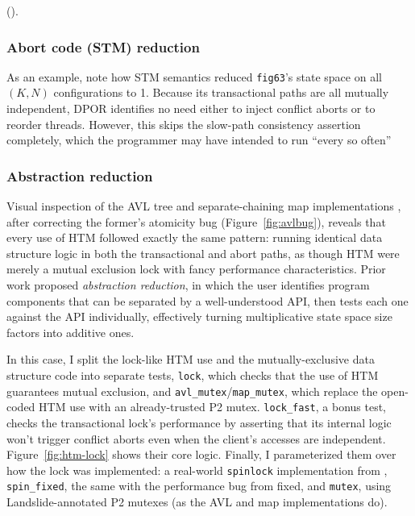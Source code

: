 


(\sect{\ref{sec:tm-retrysets}}).


\subsubsection{Abort code (STM) reduction}
\label{sec:tm-eval-stm}

As an example, note how STM semantics reduced {\tt fig63}'s state space on all $(K,N)$ configurations to 1.
Because its transactional paths are all mutually independent,
DPOR identifies no need either to inject conflict aborts or to reorder threads.
However, this skips the slow-path consistency assertion completely,
which the programmer may have intended to run ``every so often''

\subsubsection{Abstraction reduction}

Visual inspection of the AVL tree and separate-chaining map implementations \cite{tm-benchmark-cmu},
after correcting the former's atomicity bug (Figure~\ref{fig:avlbug}),
reveals that every use of HTM followed exactly the same pattern:
running identical data structure logic in both the transactional and abort paths,
as though HTM were merely a mutual exclusion lock with fancy performance characteristics.
Prior work \cite{dbug-phdthesis} proposed {\em abstraction reduction},
in which the user identifies program components that can be separated by a well-understood API,
then tests each one against the API individually,
effectively turning multiplicative state space size factors into additive ones.

In this case, I split the lock-like HTM use
and the mutually-exclusive data structure code
into separate tests,
{\tt lock}, which checks that the use of HTM guarantees mutual exclusion,
and {\tt avl\_mutex}/{\tt map\_mutex},
which replace the open-coded HTM use with an already-trusted P2 mutex.
{\tt lock\_fast},
a bonus test,
checks the transactional lock's performance by asserting that
its internal logic won't trigger conflict aborts
even when the client's accesses are independent.
Figure~\ref{fig:htm-lock} shows their core logic.
Finally, I parameterized them over how the lock was implemented:
a real-world {\tt spinlock} implementation from \cite{spinlock-rtm-github},
{\tt spin\_fixed}, the same with the performance bug from \sect{\ref{sec:tm-eval-bugs}} fixed,
and {\tt mutex}, using Landslide-annotated P2 mutexes (as the AVL and map implementations do).

